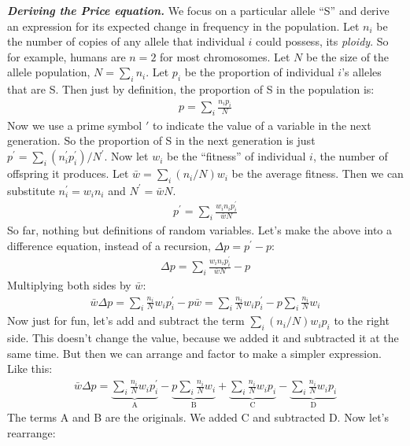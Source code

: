 \documentclass[10pt,reqno]{amsbook}
\numberwithin{equation}{chapter}
\newenvironment{mathbox}[2]
{\begin{table}[#1]
\justify\begin{tcolorbox}[enhanced, oversize]\footnotesize\noindent\textbf{\emph{#2}}}
{\end{tcolorbox}\end{table}}
\begin{document}
\begin{mathbox}{p}{Deriving the Price equation.}
We focus on a particular allele ``S'' and derive an expression for its expected change in frequency in the population. Let $n_i$ be the number of copies of any allele that individual $i$ could possess, its \emph{ploidy}. So for example, humans are $n=2$ for most chromosomes. Let $N$ be the size of the allele population, $N=\sum_i n_i$. Let $p_i$ be the proportion of individual $i$'s alleles that are S. Then just by definition, the proportion of S in the population is:
\begin{align*}
	p = \sum_i \frac{n_i p_i}{N}
\end{align*}
Now we use a prime symbol $\prime$ to indicate the value of a variable in the next generation. So the proportion of S in the next generation is just $p^\prime = \sum_i (n_i^\prime p_i^\prime)/{N^\prime}$. Now let $w_i$ be the ``fitness'' of individual $i$, the number of offspring it produces. Let $\bar w = \sum_i (n_i/N) w_i$ be the average fitness. Then we can substitute $n_i^\prime=w_i n_i$ and $N^\prime=\bar w N$.
\begin{align*}
	p^\prime = \sum_i \frac{w_i n_i p_i^\prime}{\bar w N}
\end{align*}
So far, nothing but definitions of random variables. Let's make the above into a difference equation, instead of a recursion, $\Delta p = p^\prime - p$:
\begin{align*}
	\Delta p = \sum_i \frac{w_i n_i p_i^\prime}{\bar w N} - p
\end{align*}
Multiplying both sides by $\bar w$:
\begin{align*}
	\bar w \Delta p = \sum_i \frac{ n_i }{N} w_i p_i^\prime - p \bar w 
	= \sum_i \frac{ n_i }{N} w_i p_i^\prime - p \sum_i \frac{n_i}{N}w_i
\end{align*}
Now just for fun, let's add and subtract the term $\sum_i (n_i/N)w_i p_i$ to the right side. This doesn't change the value, because we added it and subtracted it at the same time. But then we can arrange and factor to make a simpler expression. Like this:
\begin{align*}
	\bar w \Delta p = 
	\underbrace{\sum_i \frac{ n_i }{N} w_i p_i^\prime }_\text{A}
	- \underbrace{p \sum_i \frac{n_i}{N}w_i }_\text{B}
	+ \underbrace{ \sum_i \frac{n_i}{N} w_i p_i }_\text{C}
	- \underbrace{ \sum_i \frac{n_i}{N} w_i p_i }_\text{D}
\end{align*}
The terms A and B are the originals. We added C and subtracted D. Now let's rearrange:
\begin{align*}

\end{align*}
\end{mathbox}
\end{document}
